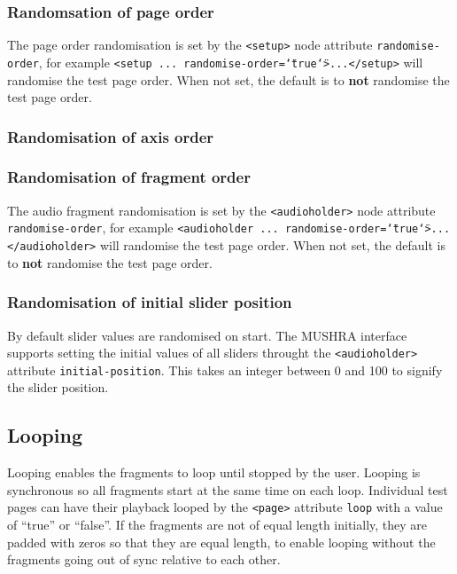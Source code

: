 \documentclass[11pt, oneside]{article}   	%
\begin{document}
		\subsubsection{Randomsation of page order}
        The page order randomisation is set by the \texttt{<setup>} node attribute \texttt{randomise-order}, for example \texttt{<setup ... randomise-order=\texttt{\char`\"}true\texttt{\char`\"}>...</setup>} will randomise the test page order. When not set, the default is to \textbf{not} randomise the test page order. 

		\subsubsection{Randomisation of axis order}

		\subsubsection{Randomisation of fragment order}
        The audio fragment randomisation is set by the \texttt{<audioholder>} node attribute \texttt{randomise-order}, for example \texttt{<audioholder ... randomise-order=\texttt{\char`\"}true\texttt{\char`\"}>...</audioholder>} will randomise the test page order. When not set, the default is to \textbf{not} randomise the test page order.

		\subsubsection{Randomisation of initial slider position}
        By default slider values are randomised on start. The MUSHRA interface supports setting the initial values of all sliders throught the \texttt{<audioholder>} attribute \texttt{initial-position}. This takes an integer between 0 and 100 to signify the slider position.

	\subsection{Looping}
	\label{sec:looping}
	    Looping enables the fragments to loop until stopped by the user. Looping is synchronous so all fragments start at the same time on each loop.
		Individual test pages can have their playback looped by the \texttt{<page>} attribute \texttt{loop} with a value of ``true'' or ``false''.
		If the fragments are not of equal length initially, they are padded with zeros so that they are equal length, to enable looping without the fragments going out of sync relative to each other. 
\end{document}
